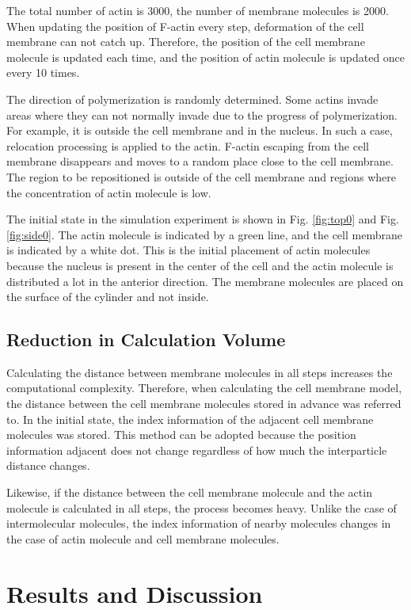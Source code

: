 \documentclass[a4paper,12pt]{book}
\begin{document}
The total number of actin is 3000, the number of membrane molecules is 2000. When updating the position of F-actin every step, deformation of the cell membrane can not catch up. Therefore, the position of the cell membrane molecule is updated each time, and the position of actin molecule is updated once every 10 times.

The direction of polymerization is randomly determined. Some actins invade areas where they can not normally invade due to the progress of polymerization. For example, it is outside the cell membrane and in the nucleus. In such a case, relocation processing is applied to the actin. F-actin escaping from the cell membrane disappears and moves to a random place close to the cell membrane. The region to be repositioned is outside of the cell membrane and regions where the concentration of actin molecule is low.

The initial state in the simulation experiment is shown in Fig. \ref{fig:top0} and Fig. \ref{fig:side0}. The actin molecule is indicated by a green line, and the cell membrane is indicated by a white dot. This is the initial placement of actin molecules because the nucleus is present in the center of the cell and the actin molecule is distributed a lot in the anterior direction. The membrane molecules are placed on the surface of the cylinder and not inside.

\section{Reduction in Calculation Volume}
Calculating the distance between membrane molecules in all steps increases the computational complexity.
Therefore, when calculating the cell membrane model, the distance between the cell membrane molecules stored in advance was referred to.
In the initial state, the index information of the adjacent cell membrane molecules was stored.
This method can be adopted because the position information adjacent does not change regardless of how much the interparticle distance changes.

Likewise, if the distance between the cell membrane molecule and the actin molecule is calculated in all steps, the process becomes heavy.
Unlike the case of intermolecular molecules, the index information of nearby molecules changes in the case of actin molecule and cell membrane molecules.



\chapter{Results and Discussion}
\end{document}
